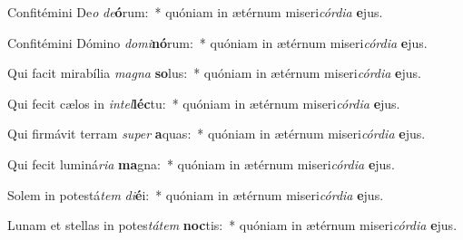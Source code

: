 \item Confitémini De\textit{o} \textit{de}\textbf{ó}rum:~* quóniam in ætérnum miseri\textit{cór}\textit{di}\textit{a} \textbf{e}jus.
\item Confitémini Dómino \textit{do}\textit{mi}\textbf{nó}rum:~* quóniam in ætérnum miseri\textit{cór}\textit{di}\textit{a} \textbf{e}jus.
\item Qui facit mirabília \textit{ma}\textit{gna} \textbf{so}lus:~* quóniam in ætérnum miseri\textit{cór}\textit{di}\textit{a} \textbf{e}jus.
\item Qui fecit cælos in \textit{in}\textit{tel}\textbf{léc}tu:~* quóniam in ætérnum miseri\textit{cór}\textit{di}\textit{a} \textbf{e}jus.
\item Qui firmávit terram \textit{su}\textit{per} \textbf{a}quas:~* quóniam in ætérnum miseri\textit{cór}\textit{di}\textit{a} \textbf{e}jus.
\item Qui fecit luminá\textit{ri}\textit{a} \textbf{ma}gna:~* quóniam in ætérnum miseri\textit{cór}\textit{di}\textit{a} \textbf{e}jus.
\item Solem in potestá\textit{tem} \textit{di}\textbf{é}i:~* quóniam in ætérnum miseri\textit{cór}\textit{di}\textit{a} \textbf{e}jus.
\item Lunam et stellas in potes\textit{tá}\textit{tem} \textbf{noc}tis:~* quóniam in ætérnum miseri\textit{cór}\textit{di}\textit{a} \textbf{e}jus.
